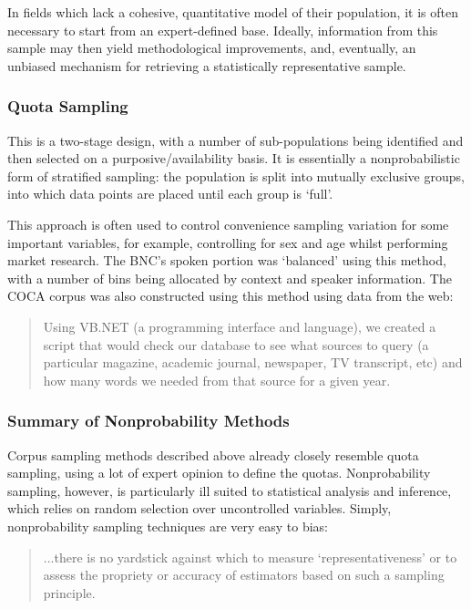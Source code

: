 In fields which lack a cohesive, quantitative model of their population, it is often necessary to start from an expert-defined base.  Ideally, information from this sample may then yield methodological improvements, and, eventually, an unbiased mechanism for retrieving a statistically representative sample.


\subsubsection{Quota Sampling}
This is a two-stage design, with a number of sub-populations being identified and then selected on a purposive/availability basis.  It is essentially a nonprobabilistic form of stratified sampling: the population is split into mutually exclusive groups, into which data points are placed until each group is `full'.

This approach is often used to control convenience sampling variation for some important variables, for example, controlling for sex and age whilst performing market research.  The BNC's spoken portion was `balanced' using this method, with a number of bins being allocated by context and speaker information.  The COCA corpus was also constructed using this method using data from the web\cite[p. 163]{Davies20090601T0000001384-6655159}:

\begin{quote}
Using VB.NET (a programming interface and language), we created a script that would check our database to see what sources to query (a particular magazine, academic journal, newspaper, TV transcript, etc) and how many words we needed from that source for a given year.
\end{quote}



\subsubsection{Summary of Nonprobability Methods}
Corpus sampling methods described above already closely resemble quota sampling, using a lot of expert opinion to define the quotas.  Nonprobability sampling, however, is particularly ill suited to statistical analysis and inference, which relies on random selection over uncontrolled variables.  Simply, nonprobability sampling techniques are very easy to bias\cite[p.19]{barnett1991sample}:

\begin{quote}
...there is no yardstick against which to measure `representativeness' or to assess the propriety or accuracy of estimators based on such a sampling principle.
\end{quote}


